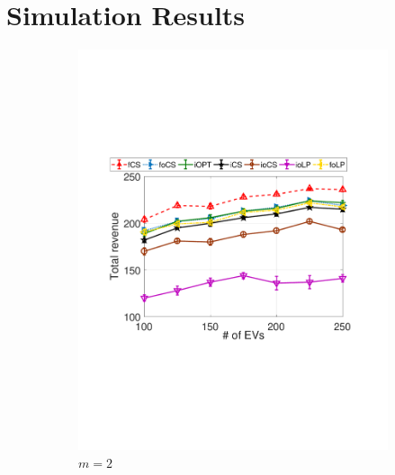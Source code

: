 \documentclass[journal]{IEEEtran}
\newcommand{\revv}[1]{{\color{black}#1}}%
\begin{document}
		
\vspace{-6mm}
\section{Simulation Results}
			\label{sec:simul}
			
			
						\begin{figure}[t]	
				\centering
				\begin{subfigure}[b]{0.25\textwidth}
					\begin{center}
						\includegraphics[width=\textwidth]{V-N-M2.pdf}
						\caption{\revv{$m=2$}}
						\label{fig:V-N-M2}
					\end{center}
				\end{subfigure}
				\begin{subfigure}[b]{0.25\textwidth}
					\begin{center}

\end{center}
\end{subfigure}
\end{figure}
\end{document}
